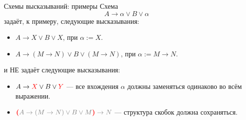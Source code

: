 \documentclass[aspectratio=169]{beamer}
\begin{document}
\begin{frame}{Схемы высказываний: примеры}
Схема $$A \rightarrow \alpha \vee B \vee \alpha$$ задаёт, к примеру, следующие высказывания:
\begin{itemize}
\item $A \rightarrow X \vee B \vee X$, при $\alpha := X$.
\item $A \rightarrow (M\rightarrow N) \vee B \vee (M \rightarrow N)$, при $\alpha := M\rightarrow N$.
\end{itemize}

\vspace{0.5cm}\pause

и {\color{red} НЕ} задаёт следующие высказывания:
\begin{itemize}
\item {\color{red} $A \rightarrow {\color{red}X} \vee B \vee {\color{red}Y}$} --- все вхождения $\alpha$ должны заменяться одинаково во всём выражении.
\item { ${\color{red}\textbf{(}}{\color{gray}A \rightarrow (M \rightarrow N) \vee B \vee M}{\color{red}\textbf{)}} \color{gray}\rightarrow N$} --- структура скобок должна сохраняться.
\end{itemize}

\end{frame}

%
%
%
%
%
%
\end{document}
